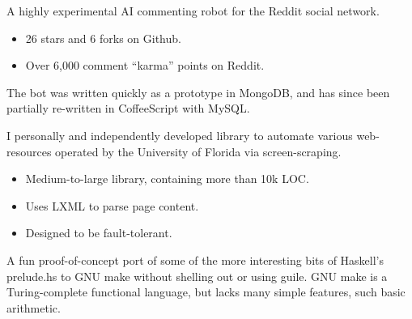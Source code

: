 \documentclass[11pt, letterpaper]{article}
\begin{document}
A highly experimental AI commenting robot for the Reddit social network.

\begin{itemize}
    \item 26 stars and 6 forks on Github.
    \item Over 6,000 comment “karma” points on Reddit.
\end{itemize}

The bot was written quickly as a prototype in MongoDB, and has since been
partially re-written in CoffeeScript with MySQL.


I personally and independently developed library to automate various
web-resources operated by the University of Florida via screen-scraping.

\begin{itemize}
    \item Medium-to-large library, containing more than 10k LOC.
    \item Uses LXML to parse page content.
    \item Designed to be fault-tolerant.
\end{itemize}


A fun proof-of-concept port of some of the more interesting bits of Haskell’s
prelude.hs to GNU make without shelling out or using guile. GNU make is a
Turing-complete functional language, but lacks many simple features, such basic
arithmetic.

\vfill\vfill\vfill\vfill

\end{document}
